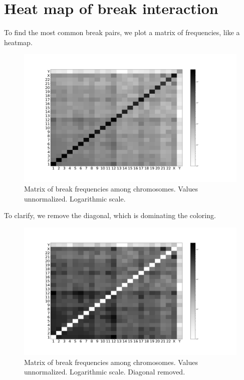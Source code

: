 \documentclass[a4paper,10pt]{article}
\begin{document}
\pagebreak
\section*{Heat map of break interaction}

To find the most common break pairs, we plot a matrix of frequencies, like a heatmap.


\begin{figure}[H]
\includegraphics[scale=0.24]{figures/Matrix_break_frequencies_unnormalized.pdf}
\caption{Matrix of break frequencies among chromosomes. Values unnormalized. Logarithmic scale.}
\end{figure}

To clarify, we remove the diagonal, which is dominating the coloring.

\begin{figure}[H]
\includegraphics[scale=0.24]{figures/Matrix_break_frequencies_unnormalized_nodiagonal.pdf}
\caption{Matrix of break frequencies among chromosomes. Values unnormalized. Logarithmic scale. Diagonal removed.}
\end{figure}
\end{document}
